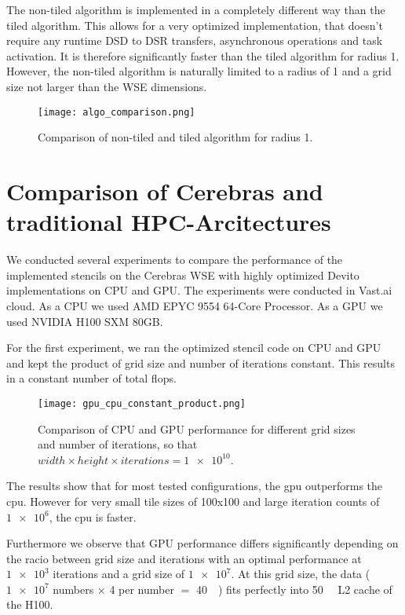 The non-tiled algorithm is implemented in a completely different way than the tiled algorithm.
This allows for a very optimized implementation, that doesn't require any runtime DSD to DSR transfers, asynchronous operations and task activation.
It is therefore significantly faster than the tiled algorithm for radius 1.
However, the non-tiled algorithm is naturally limited to a radius of 1 and a grid size not larger than the WSE dimensions.

\begin{figure}[h]
    \centering
    \texttt{[image: algo\_comparison.png]}
    \caption{Comparison of non-tiled and tiled algorithm for radius 1.}
    \label{fig:algo_comparison}
\end{figure}

\section{Comparison of Cerebras and traditional HPC-Arcitectures}
We conducted several experiments to compare the performance of the implemented stencils on the Cerebras WSE with highly optimized Devito implementations on CPU and GPU. The experiments were conducted in Vast.ai cloud.
As a CPU we used AMD EPYC 9554 64-Core Processor.
As a GPU we used NVIDIA H100 SXM 80GB.

For the first experiment, we ran the optimized stencil code on CPU and GPU and kept the product of grid size and number of iterations constant. This results in a constant number of total flops. 

\begin{figure}[h]
    \centering
    \texttt{[image: gpu\_cpu\_constant\_product.png]}
    \caption{Comparison of CPU and GPU performance for different grid sizes and number of iterations, so that $width \times height \times iterations = \num{1e10}$.}
    \label{fig:gpu_cpu_constant_product}
\end{figure}

The results show that for most tested configurations, the gpu outperforms the cpu.
However for very small tile sizes of 100x100 and large iteration counts of $\num{1e6}$, the cpu is faster.

Furthermore we observe that GPU performance differs significantly depending on the racio between grid size and iterations with an optimal performance at $\num{1e3}$ iterations and a grid size of $\num{1e7}$. At this grid size, the data ($\num{1e7}$ numbers $\times$ \qty{4}{\byte} per number $=$ \qty{40}{\mega\byte}) fits perfectly into \qty{50}{\mega\byte} L2 cache of the H100. 

